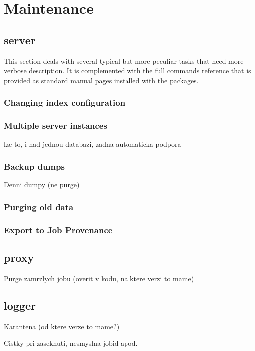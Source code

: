 \section{Maintenance}

\subsection{\LB server}

This section deals with several typical but more peculiar tasks
that need more verbose description.
It is complemented with the full commands reference that is provided
as standard manual pages installed with the \LB packages.

\subsubsection{Changing index configuration}


\subsubsection{Multiple server instances}

lze to, i nad jednou databazi, zadna automaticka podpora

\subsubsection{Backup dumps}

Denni dumpy (ne purge)

\subsubsection{Purging old data}


\subsubsection{Export to Job Provenance}


\subsection{\LB proxy}

Purge zamrzlych jobu (overit v kodu, na ktere verzi to mame)

\subsection{\LB logger}

Karantena (od ktere verze to mame?)

Cistky pri zaseknuti, nesmyslna jobid apod.
